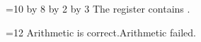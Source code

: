 =10
\advance{} by 8
\multiply{} by 2
\divide{} by 3
\noindent The register contains \the{}.\par
\ifnum{}=12 Arithmetic is correct.\else Arithmetic failed.\fi
\par\bye
